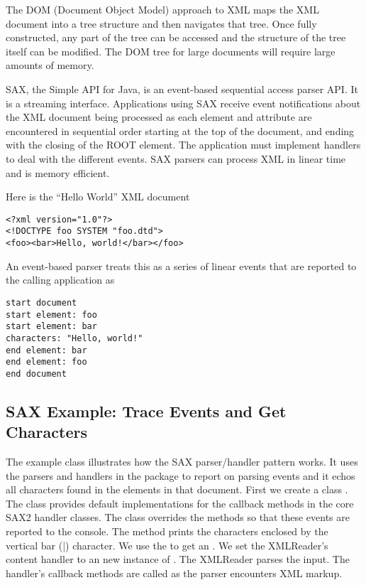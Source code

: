 The DOM (Document Object Model) approach to XML maps the XML document into a tree structure
and then navigates that tree.  
Once fully constructed, any part of the tree can be accessed and the structure of 
the tree itself can be modified.
The DOM tree for large documents will require large amounts of memory.

SAX, the Simple API for Java, is an event-based sequential access
parser API.  It is a streaming interface.  Applications using SAX
receive event notifications about the XML document being processed as each
element and attribute are encountered in sequential order starting at the
top of the document, and ending with the closing of the ROOT
element. The application must implement handlers to deal with the different events.
SAX parsers can process XML in
linear time and is memory efficient.

Here is the ``Hello World'' XML document
\begin{verbatim}
<?xml version="1.0"?>
<!DOCTYPE foo SYSTEM "foo.dtd">
<foo><bar>Hello, world!</bar></foo>
\end{verbatim}

An event-based parser treats this as a series of linear events
that are reported to the calling application as
\begin{verbatim}
start document
start element: foo
start element: bar
characters: "Hello, world!"
end element: bar
end element: foo
end document
\end{verbatim}

\subsection{SAX Example: Trace Events and Get Characters}

The example class  illustrates 
how the SAX parser/handler pattern works.
It uses the parsers and handlers in the
 package to report on parsing events and it
echos all characters found in the elements in that document.
%
% 
First we create a class .
%
%
The class  provides default implementations
for the callback methods in the core SAX2 handler classes.
The  class overrides the methods 
so that these events are reported to the console.
The  method prints the characters enclosed by
the vertical bar (|) character.
%
%
We use the  to get an .
We set the XMLReader's content handler to an new instance
of .
The XMLReader parses the input.
The handler's callback methods are called as the parser encounters
XML markup.

